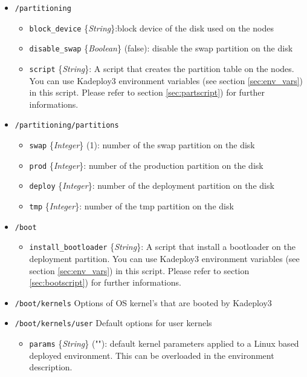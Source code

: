 \documentclass[a4wide,10pt,oneside]{book}
\newcommand{\ypath}[1]{\texttt{#1}}
\newcommand{\yfield}[2]{\texttt{#1} {\small\{{\emph{#2}}\}}:}
\newcommand{\yfieldd}[3]{\texttt{#1} {\small\{{\emph{#2}}\}} {\small(}#3{\small)}:}
\begin{document}
\begin{itemize}
  \item \ypath{/partitioning}
  \begin{itemize}
    \item \yfield{block\_device}{String}block device of the disk used on the nodes
    \item \yfieldd{disable\_swap}{Boolean}{false} disable the swap partition on the disk
    \item \yfield{script}{String} A script that creates the partition table on the nodes. You can use Kadeploy3 environment variables (see section \ref{sec:env_vars}) in this script. Please refer to section \ref{sec:partscript}) for further informations.
  \end{itemize}

  \item \ypath{/partitioning/partitions}
  \begin{itemize}
    \item \yfieldd{swap}{Integer}{1} number of the swap partition on the disk
    \item \yfield{prod}{Integer} number of the production partition on the disk
    \item \yfield{deploy}{Integer} number of the deployment partition on the disk
    \item \yfield{tmp}{Integer} number of the tmp partition on the disk
  \end{itemize}

  \item \ypath{/boot}
  \begin{itemize}
    \item \yfield{install\_bootloader}{String} A script that install a bootloader on the deployment partition. You can use Kadeploy3 environment variables (see section \ref{sec:env_vars}) in this script. Please refer to section \ref{sec:bootscript}) for further informations.
  \end{itemize}

  \item \ypath{/boot/kernels} Options of OS kernel's that are booted by Kadeploy3
  \item \ypath{/boot/kernels/user} Default options for user kernels
  \begin{itemize}
    \item \yfieldd{params}{String}{""} default kernel parameters applied to a Linux based deployed environment. This can be overloaded in the environment description.
  \end{itemize}


\end{itemize}
\end{document}
